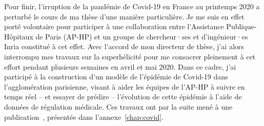 Pour finir, l'irruption de la pandémie de Covid-19 en France au printemps 2020 a perturbé le cours de ma thèse d'une manière particulière.
Je me suis en effet porté volontaire pour participer à une collaboration entre l'Assistance Publique-Hôpitaux de Paris (AP-HP) et un groupe de chercheur·ses et d'ingénieur·es Inria constitué à cet effet.
Avec l'accord de mon directeur de thèse, j'ai alors interrompu mes travaux sur la superhélicité pour me consacrer pleinement à cet effort pendant plusieurs semaines en avril et mai 2020.
Dans ce cadre, j'ai participé à la construction d'un modèle de l'épidémie de Covid-19 dans l'agglomération parisienne, visant à aider les équipes de l'AP-HP à suivre en temps réel -- et essayer de prédire -- l'évolution de cette épidémie à l'aide de données de régulation médicale.
Ces travaux ont par la suite mené à une publication~\citep{gaubert2020}, présentée dans l'annexe~\ref{chap:covid}.

